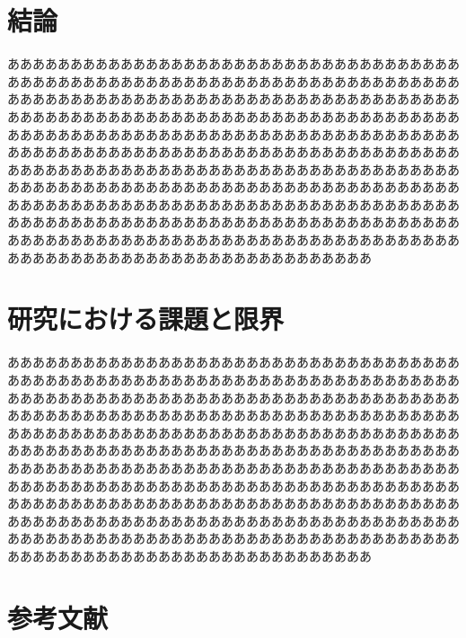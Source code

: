 \documentclass[a4paper, 11pt]{jsarticle}
\begin{document}
\section{結論}
あああああああああああああああああああああああああああああああああああああああああああああああああああああああああああああああああああああああああああああああああああああああああああああああああああああああああああああああああああああああああああああああああああああああああああああああああああああああああああああああああああああああああああああああああああああああああああああああああああああああああああああああああああああああああああああああああああああああああああああああああああああああああああああああああああああああああああああああああああああああああああああああああああああああああああああああああああああああああああああああああああああああああああああああああああああああああああああああああああああああああああああああああああああああああああああああああああああああああああああああああああああああああああああああああああああああああ
\section{研究における課題と限界}
あああああああああああああああああああああああああああああああああああああああああああああああああああああああああああああああああああああああああああああああああああああああああああああああああああああああああああああああああああああああああああああああああああああああああああああああああああああああああああああああああああああああああああああああああああああああああああああああああああああああああああああああああああああああああああああああああああああああああああああああああああああああああああああああああああああああああああああああああああああああああああああああああああああああああああああああああああああああああああああああああああああああああああああああああああああああああああああああああああああああああああああああああああああああああああああああああああああああああああああああああああああああああああああああああああああああああ
\section*{参考文献}
\begingroup
\renewcommand{\section}[2]{}


\endgroup
\section*{付録}
\end{document}
